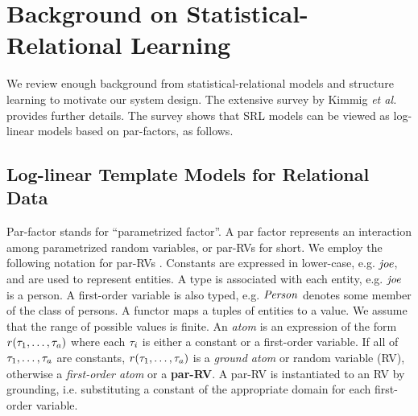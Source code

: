 \documentclass{IEEEtran}
\begin{document}
\section{Background on Statistical-Relational Learning} We review enough background from statistical-relational models and structure learning to motivate our system design. The extensive survey by Kimmig {\em et al.} \cite{Kimmig2015} provides further details. The survey shows that SRL models can be viewed as log-linear models based on par-factors, as follows.

\subsection{Log-linear Template Models for Relational Data} \label{sec:log-linear}

Par-factor stands for ``parametrized factor''. A par factor represents an interaction among parametrized random variables, or par-RVs for short. 
We employ the following notation 
for par-RVs \cite[2.2.5]{Kimmig2015}.
	Constants are expressed in lower-case, e.g. $\it{joe}$, and are used to represent entities. A type is associated with each entity, e.g. $\it{joe}$ is a person. 
A first-order variable is also typed, e.g. $\it{Person}$ denotes some member of the class of persons. A functor maps a tuples of entities to a value. We assume that the range of possible values is finite.  An {\em atom} is an expression of the form $r(\tau_{1},\ldots,\tau_{a})$ where each $\tau_{i}$ is either a constant or a first-order variable. If all of $\tau_{1},\ldots,\tau_{a}$ are constants, $r(\tau_{1},\ldots,\tau_{a})$ is a {\em ground atom} or random variable (RV), otherwise a {\em first-order atom} or a \textbf{par-RV}. A par-RV is instantiated to an RV by grounding, i.e. substituting a constant of the appropriate domain for each first-order variable. 
\end{document}
